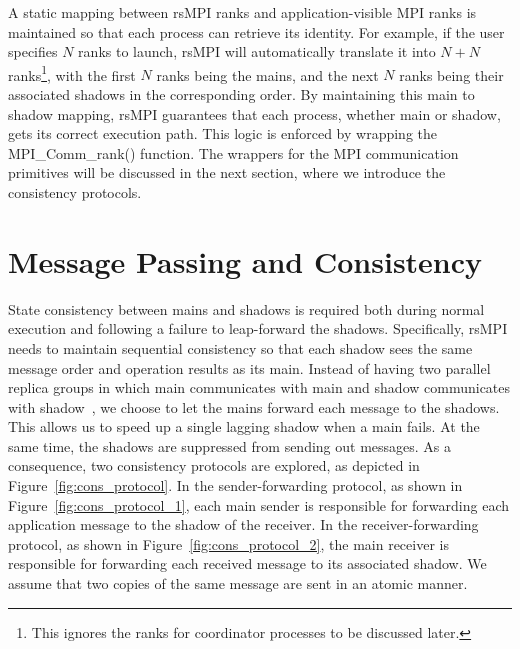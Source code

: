 A static mapping between rsMPI ranks and application-visible MPI ranks is maintained so that each process can retrieve its identity. For example, if the user specifies $N$ ranks to launch, rsMPI will automatically translate it into $N + N$ ranks\footnote{This ignores the ranks for coordinator processes to be discussed later.}, with the first $N$ ranks being the mains, and the next $N$ ranks being their associated shadows in the corresponding order. By maintaining this main to shadow mapping, rsMPI guarantees that each process, whether main or shadow, gets its correct execution path. 
This logic is enforced by wrapping the MPI\_Comm\_rank() function. %
The wrappers for the MPI communication primitives will be discussed in the next section, where we introduce the consistency protocols.

\section{Message Passing and Consistency}
\label{sec:msg_consistency}
State consistency between mains and shadows is required both during normal execution and following a failure to leap-forward the shadows. 
Specifically, rsMPI needs to maintain sequential consistency so that each shadow sees the same message order and operation results as its main. 
Instead of having two parallel replica groups in which main communicates with main and shadow communicates with shadow~\cite{ferreira_sc_2011}, we choose to let the mains forward each message to the shadows. This allows us to speed up a single lagging shadow when a main fails. At the same time, the shadows are suppressed from sending out messages. As a consequence, two consistency protocols are explored, as depicted in Figure~\ref{fig:cons_protocol}. In the sender-forwarding protocol, as shown in Figure~\ref{fig:cons_protocol_1}, each main sender is responsible for forwarding each application message to the shadow of the receiver. In the receiver-forwarding protocol, as shown in Figure~\ref{fig:cons_protocol_2}, the main receiver is responsible for forwarding each received message to its associated shadow. 
We assume that two copies of the same message are sent in an atomic manner.


